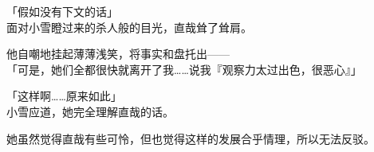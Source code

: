 「假如没有下文的话」\\

面对小雪瞪过来的杀人般的目光，直哉耸了耸肩。

他自嘲地挂起薄薄浅笑，将事实和盘托出——\\

「可是，她们全都很快就离开了我……说我『观察力太过出色，很恶心』」

「这样啊……原来如此」\\

小雪应道，她完全理解直哉的话。

她虽然觉得直哉有些可怜，但也觉得这样的发展合乎情理，所以无法反驳。
